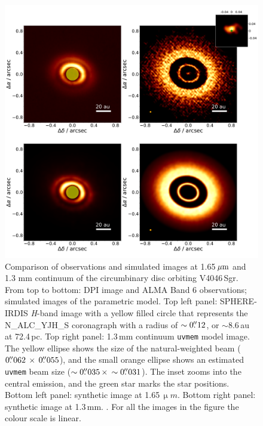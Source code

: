 \documentclass[letters,usenatbib,times]{mnras}
\begin{document}
\begin{figure}
  \includegraphics[width=\textwidth]{hot_two_E.pdf}
  \caption{Comparison of observations and simulated images at 1.65\,$\hbox{$\mu$m}$ and 1.3 mm continuum of the circumbinary disc orbiting V4046\,Sgr. From top to bottom: DPI image and ALMA Band 6 observations; simulated images of the parametric model. Top left panel: SPHERE-IRDIS \textit{H}-band image with a yellow filled circle that represents the N\_ALC\_YJH\_S coronagraph with a radius of $\sim0\hbox{$.\!\!^{\prime\prime}$}12$, or $\sim$8.6\,au at 72.4\,pc. Top right panel: 1.3\,mm continuum {\tt uvmem} model image. The yellow ellipse shows the size of the natural-weighted beam ($ 0\hbox{$.\!\!^{\prime\prime}$}062 \, \times \, 0\hbox{$.\!\!^{\prime\prime}$}055$), and the small orange ellipse shows an estimated {\tt uvmem} beam size ($\sim0\hbox{$.\!\!^{\prime\prime}$}035 \, \times \, \sim0\hbox{$.\!\!^{\prime\prime}$}031$). The inset zooms into the central emission, and the green star marks the star positions. Bottom left panel: synthetic image at 1.65\,$\upmu m$. Bottom right panel: synthetic image at 1.3\,mm. . For all the images in the figure the colour scale is linear.}
  \label{fig:images_vs_simulated}
\end{figure}
\end{document}

